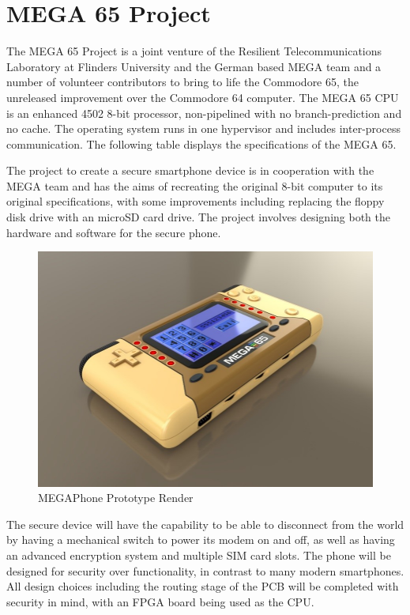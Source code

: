 \section{MEGA 65 Project}

The MEGA 65 Project is a joint venture of the Resilient Telecommunications Laboratory at Flinders University and the German based MEGA team and a number of volunteer contributors to bring to life the Commodore 65, the unreleased improvement over the Commodore 64 computer.
The MEGA 65 CPU is an enhanced 4502 8-bit processor, non-pipelined with no branch-prediction and no cache.
The operating system runs in one hypervisor and includes inter-process communication.
The following table displays the specifications of the MEGA 65. 



The project to create a secure smartphone device is in cooperation with the MEGA team and has the aims of recreating the original 8-bit computer to its original specifications, with some improvements including replacing the floppy disk drive with an microSD card drive.
The project involves designing both the hardware and software for the secure phone. 

\begin{figure}
	\includegraphics[width=\linewidth]{render.jpg}
	\caption{MEGAPhone Prototype Render}
	\label{fig:render}
\end{figure}

The secure device will have the capability to be able to disconnect from the world by having a mechanical switch to power its modem on and off, as well as having an advanced encryption system and multiple SIM card slots.
The phone will be designed for security over functionality, in contrast to many modern smartphones.
All design choices including the routing stage of the PCB will be completed with security in mind, with an FPGA board being used as the CPU.

